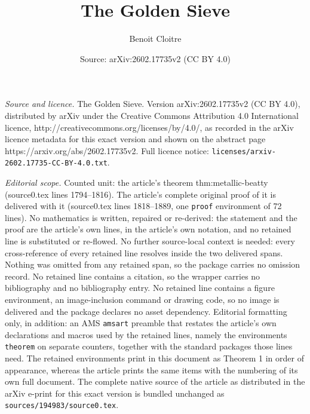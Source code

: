 \documentclass[10pt,a4paper]{amsart}
\title{The Golden Sieve}
\author{Benoit Cloitre}
\date{Source: arXiv:2602.17735v2 (CC BY 4.0)}
\begin{document}
\maketitle

\noindent\emph{Source and licence.} The Golden Sieve. Version arXiv:2602.17735v2 (CC BY 4.0), distributed by arXiv under the Creative Commons Attribution 4.0 International licence, http://creativecommons.org/licenses/by/4.0/, as recorded in the arXiv licence metadata for this exact version and shown on the abstract page https://arxiv.org/abs/2602.17735v2. Full licence notice: \texttt{licenses/arxiv-2602.17735-CC-BY-4.0.txt}.\par\smallskip

\noindent\textit{Editorial scope.} Counted unit: the article's theorem thm:metallic-beatty (source0.tex lines 1794--1816). The article's complete original proof of it is delivered with it (source0.tex lines 1818--1889, one \texttt{proof} environment of 72 lines). No mathematics is written, repaired or re-derived: the statement and the proof are the article's own lines, in the article's own notation, and no retained line is substituted or re-flowed.  No further source-local context is needed: every cross-reference of every retained line resolves inside the two delivered spans.  Nothing was omitted from any retained span, so the package carries no omission record.  No retained line contains a citation, so the wrapper carries no bibliography and no bibliography entry.  No retained line contains a figure environment, an image-inclusion command or drawing code, so no image is delivered and the package declares no asset dependency.  Editorial formatting only, in addition: an AMS \texttt{amsart} preamble that restates the article's own declarations and macros used by the retained lines, namely the environments \texttt{theorem} on separate counters, together with the standard packages those lines need.  The retained environments print in this document as Theorem 1 in order of appearance, whereas the article prints the same items with the numbering of its own full document.  The complete native source of the article as distributed in the arXiv e-print for this exact version is bundled unchanged as \texttt{sources/194983/source0.tex}.
\end{document}

